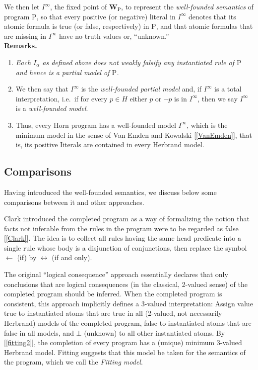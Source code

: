 We then let $I^\infty$, the fixed point of $\mathbf{W}_\mathrm{P}$, to represent the \emph{well-founded semantics} of program $\mathrm{P}$, so that every positive (or negative) literal in $I^\infty$ denotes that its atomic formula is true (or false, respectively) in $\mathrm{P}$, and that atomic formulas that are missing in $I^\infty$ have no truth values or, ``unknown.''
\medskip\\
\textbf{Remarks.}
\begin{enumerate}[label=(\alph*)]
%
\item \emph{Each $I_\alpha$ as defined above does not weakly falsify any instantiated rule of $\mathrm{P}$ and hence is a partial model of $\mathrm{P}$.}
%
\item We then say that $I^\infty$ is the \emph{well-founded partial model} and, if $I^\infty$ is a total interpretation, i.e.\ if for every $p \in H$ either $p$ or $\neg p$ is in $I^\infty$, then we say $I^\infty$ is a \emph{well-founded model}.
%
\item Thus, every Horn program has a well-founded model $I^\infty$, which is the minimum model in the sense of Van Emden and Kowalski [\ref{VanEmden}], that is, its positive Iiterals are contained in every Herbrand model.
%
\end{enumerate}
\subsection{Comparisons}
Having introduced the well-founded semantics, we discuss below some comparisons between it and other approaches.

Clark introduced the completed program as a way of formalizing the notion that facts not inferable from the rules in the program were to be regarded as false [\ref{Clark}]. The idea is to collect all rules having the same head predicate into a single rule whose body is a disjunction of conjunctions, then replace the symbol $\leftarrow$ (if) by $\leftrightarrow$ (if and only).

The original ``logical consequence'' approach essentially declares that only conclusions that are logical consequences (in the classical, 2-valued sense) of the completed program should be inferred. When the completed program is consistent, this approach implicitly defines a 3-valued interpretation: Assign value true to instantiated atoms that are true in all (2-valued, not necessarily Herbrand) models of the completed program, false to instantiated atoms that are false in all models, and $\bot$ (unknown) to all other instantiated atoms. By [\ref{fitting2}], the completion of every program has a (unique) minimum 3-valued Herbrand model. Fitting suggests that this model be taken for the semantics of the program, which we call the \emph{Fitting model}. 

